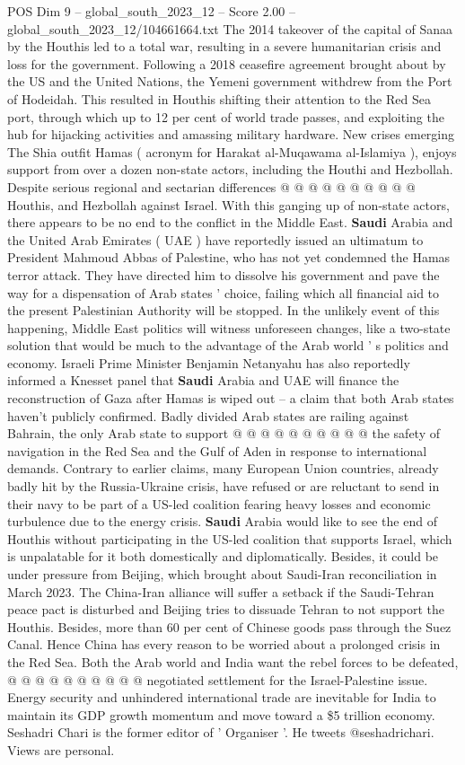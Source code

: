\begin{textsample}{POS Dim 9 – global\_south\_2023\_12 – Score 2.00 – global\_south\_2023\_12/104661664.txt}
The 2014 takeover of the capital of Sanaa by the Houthis led to a total war, resulting in a severe humanitarian crisis and loss for the government.
Following a 2018 ceasefire agreement brought about by the US and the United Nations, the Yemeni government withdrew from the Port of Hodeidah.
This resulted in Houthis shifting their attention to the Red Sea port, through which up to 12 per cent of world trade passes, and exploiting the hub for hijacking activities and amassing military hardware.
New crises emerging The Shia outfit Hamas ( acronym for Harakat al-Muqawama al-Islamiya ), enjoys support from over a dozen non-state actors, including the Houthi and Hezbollah.
Despite serious regional and sectarian differences @ @ @ @ @ @ @ @ @ @ Houthis, and Hezbollah against Israel.
With this ganging up of non-state actors, there appears to be no end to the conflict in the Middle East. \textbf{Saudi} Arabia and the United Arab Emirates ( UAE ) have reportedly issued an ultimatum to President Mahmoud Abbas of Palestine, who has not yet condemned the Hamas terror attack.
They have directed him to dissolve his government and pave the way for a dispensation of Arab states ' choice, failing which all financial aid to the present Palestinian Authority will be stopped.
In the unlikely event of this happening, Middle East politics will witness unforeseen changes, like a two-state solution that would be much to the advantage of the Arab world ' s politics and economy.
Israeli Prime Minister Benjamin Netanyahu has also reportedly informed a Knesset panel that \textbf{Saudi} Arabia and UAE will finance the reconstruction of Gaza after Hamas is wiped out -- a claim that both Arab states haven't publicly confirmed.
Badly divided Arab states are railing against Bahrain, the only Arab state to support @ @ @ @ @ @ @ @ @ @ the safety of navigation in the Red Sea and the Gulf of Aden in response to international demands.
Contrary to earlier claims, many European Union countries, already badly hit by the Russia-Ukraine crisis, have refused or are reluctant to send in their navy to be part of a US-led coalition fearing heavy losses and economic turbulence due to the energy crisis. \textbf{Saudi} Arabia would like to see the end of Houthis without participating in the US-led coalition that supports Israel, which is unpalatable for it both domestically and diplomatically.
Besides, it could be under pressure from Beijing, which brought about Saudi-Iran reconciliation in March 2023.
The China-Iran alliance will suffer a setback if the Saudi-Tehran peace pact is disturbed and Beijing tries to dissuade Tehran to not support the Houthis.
Besides, more than 60 per cent of Chinese goods pass through the Suez Canal.
Hence China has every reason to be worried about a prolonged crisis in the Red Sea.
Both the Arab world and India want the rebel forces to be defeated, @ @ @ @ @ @ @ @ @ @ negotiated settlement for the Israel-Palestine issue.
Energy security and unhindered international trade are inevitable for India to maintain its GDP growth momentum and move toward a \$5 trillion economy.
Seshadri Chari is the former editor of ' Organiser '.
He tweets @seshadrichari.
Views are personal.

\end{textsample}
